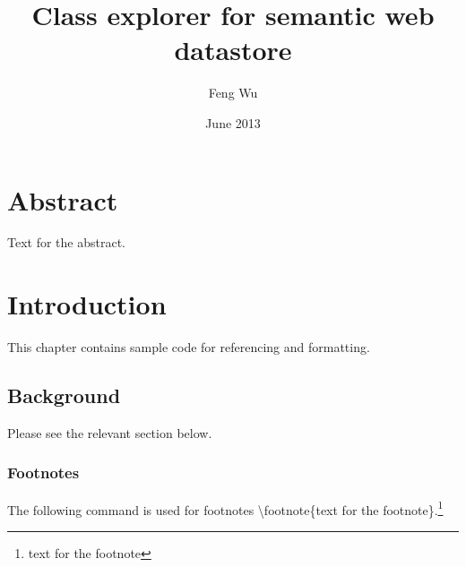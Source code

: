 \documentclass[12pt]{cls}
\title{Class explorer for semantic web datastore}
\author{Feng Wu}
\date{June 2013}
\begin{document}
\muntitlepage

\setcounter{secnumdepth}{3} \setcounter{tocdepth}{3}

 \setcounter{page}{1}

\doublespacing
\setlength{\topmargin}{-.5in}

\chapter*{Abstract}
Text for the abstract.

\renewcommand{\contentsname}{Table of Contents}
\tableofcontents{}
\listoftables{}
\listoffigures{}

\doublespacing
\clearpage



\chapter{Introduction}
\setcounter{secnumdepth}{3} 
\setcounter{page}{1} \pagestyle{myheadings}
\markboth{}{}\markright{} \rhead{\thepage} \setcounter{page}{1}
\pagestyle{myheadings}  \rhead{\thepage}
\setcounter{page}{1}

This chapter contains sample code for referencing and formatting.

\section{Background}
Please see the relevant section below.

\subsection{Footnotes}
The following command is used for footnotes \textbackslash footnote\{text for the footnote\}.\footnote{text for the footnote}
\end{document}

